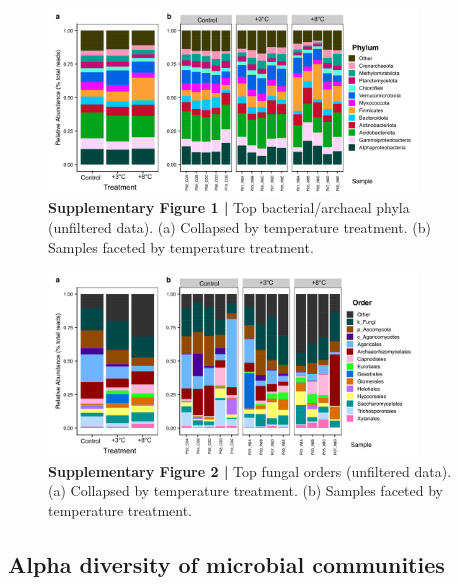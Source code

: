 \documentclass[
  10pt,
  letterpaper,
  DIV=11,
  numbers=noendperiod]{scrartcl}
\begin{document}
\begin{figure}

{\centering \includegraphics[width=0.87\textwidth,height=\textheight]{FIGURES/taxa_plots_main_ssu.png}

}

\caption{\textbf{Supplementary Figure 1 |} Top bacterial/archaeal phyla
(unfiltered data). (a) Collapsed by temperature treatment. (b) Samples
faceted by temperature treatment.}

\end{figure}

\begin{figure}

{\centering \includegraphics[width=0.87\textwidth,height=\textheight]{FIGURES/taxa_plots_main_its.png}

}

\caption{\textbf{Supplementary Figure 2 |} Top fungal orders (unfiltered
data). (a) Collapsed by temperature treatment. (b) Samples faceted by
temperature treatment.}

\end{figure}

\hypertarget{alpha-diversity-of-microbial-communities}{%
\subsection{Alpha diversity of microbial
communities}\label{alpha-diversity-of-microbial-communities}}
\end{document}
